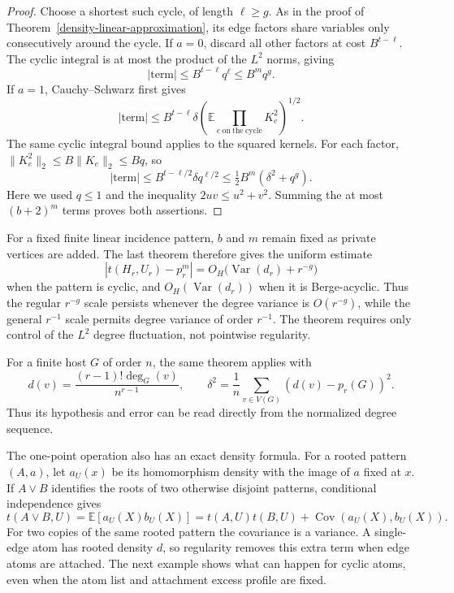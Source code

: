 \documentclass[a4paper,11pt,reqno]{amsart}
\theoremstyle{plain}
\theoremstyle{definition}
\theoremstyle{remark}
\begin{document}
\begin{proof}
Choose a shortest such cycle, of length $\ell\ge g$.
As in the proof of Theorem~\ref{density-linear-approximation},
its edge factors share variables only consecutively around the
cycle.  If $a=0$, discard all other factors at cost $B^{t-\ell}$.
The cyclic integral is at most the product of the $L^2$ norms,
giving
\[
 |\text{term}|\le B^{t-\ell}q^\ell\le B^m q^g.
\]
If $a=1$, Cauchy--Schwarz first gives
\[
 |\text{term}|
 \le B^{t-\ell}\delta
      \left(\mathbb E\prod_{e\ \mathrm{on\ the\ cycle}}K_e^2\right)^{1/2}.
\]
The same cyclic integral bound applies to the squared kernels.
For each factor,
$\|K_e^2\|_2\le B\|K_e\|_2\le Bq$, so
\[
 |\text{term}|
 \le B^{t-\ell/2}\delta q^{\ell/2}
 \le\tfrac12B^m(\delta^2+q^g).
\]
Here we used $q\le1$ and the inequality $2uv\le u^2+v^2$.
Summing the at most $(b+2)^m$ terms proves both assertions.
\end{proof}

For a fixed finite linear incidence pattern, $b$ and $m$ remain
fixed as private vertices are added.  The last theorem therefore
gives the uniform estimate
\[
 |t(H_r,U_r)-p_r^m|
    =O_H\bigl(\operatorname{Var}(d_r)+r^{-g}\bigr)
\]
when the pattern is cyclic, and
$O_H(\operatorname{Var}(d_r))$ when it is Berge-acyclic.
Thus the regular $r^{-g}$ scale persists whenever the degree
variance is $O(r^{-g})$, while the general $r^{-1}$ scale permits
degree variance of order $r^{-1}$.  The theorem requires only
control of the $L^2$ degree fluctuation, not pointwise regularity.

For a finite host $G$ of order $n$, the same theorem applies with
\[
 d(v)=\frac{(r-1)!\deg_G(v)}{n^{r-1}},\qquad
 \delta^2=\frac1n\sum_{v\in V(G)}(d(v)-p_r(G))^2.
\]
Thus its hypothesis and error can be read directly from the
normalized degree sequence.

The one-point operation also has an exact density formula.  For a
rooted pattern $(A,a)$, let $a_U(x)$ be its homomorphism density
with the image of $a$ fixed at $x$.  If $A\vee B$ identifies the
roots of two otherwise disjoint patterns, conditional independence
gives
\begin{equation}\label{density-rooted-gluing}
 t(A\vee B,U)=\mathbb E[a_U(X)b_U(X)]
   =t(A,U)t(B,U)+\operatorname{Cov}(a_U(X),b_U(X)).
\end{equation}
For two copies of the same rooted pattern the covariance is a
variance.  A single-edge atom has rooted density $d$, so regularity
removes this extra term when edge atoms are attached.  The next
example shows what can happen for cyclic atoms, even when the atom
list and attachment excess profile are fixed.
\end{document}
